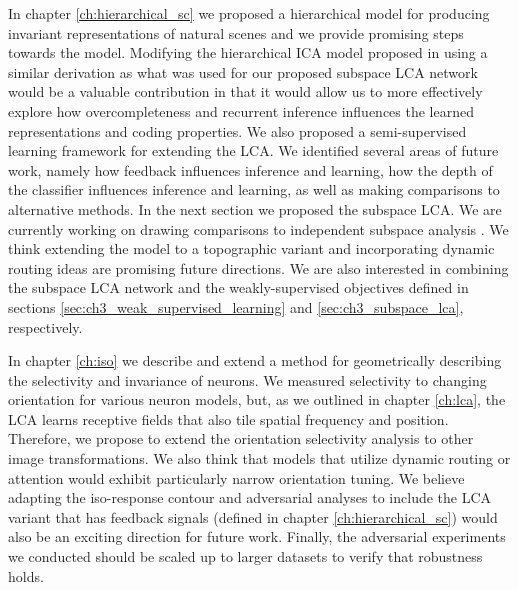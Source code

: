 In chapter \ref{ch:hierarchical_sc} we proposed a hierarchical model for producing invariant representations of natural scenes and we provide promising steps towards the model. Modifying the hierarchical ICA model proposed in \parencite{karklin2003learning} using a similar derivation as what was used for our proposed subspace LCA network would be a valuable contribution in that it would allow us to more effectively explore how overcompleteness and recurrent inference influences the learned representations and coding properties. We also proposed a semi-supervised learning framework for extending the LCA. We identified several areas of future work, namely how feedback influences inference and learning, how the depth of the classifier influences inference and learning, as well as making comparisons to alternative methods. In the next section we proposed the subspace LCA. We are currently working on drawing comparisons to independent subspace analysis \parencite{hyvarinen2000emergence}. We think extending the model to a topographic variant and incorporating dynamic routing ideas \parencite{olshausen1993neurobiological} are promising future directions. We are also interested in combining the subspace LCA network and the weakly-supervised objectives defined in sections \ref{sec:ch3_weak_supervised_learning} and \ref{sec:ch3_subspace_lca}, respectively.

In chapter \ref{ch:iso} we describe and extend a method for geometrically describing the selectivity and invariance of neurons. We measured selectivity to changing orientation for various neuron models, but, as we outlined in chapter \ref{ch:lca}, the LCA learns receptive fields that also tile spatial frequency and position. Therefore, we propose to extend the orientation selectivity analysis to other image transformations. We also think that models that utilize dynamic routing or attention would exhibit particularly narrow orientation tuning. We believe adapting the iso-response contour and adversarial analyses to include the LCA variant that has feedback signals (defined in chapter \ref{ch:hierarchical_sc}) would also be an exciting direction for future work. Finally, the adversarial experiments we conducted should be scaled up to larger datasets to verify that robustness holds.